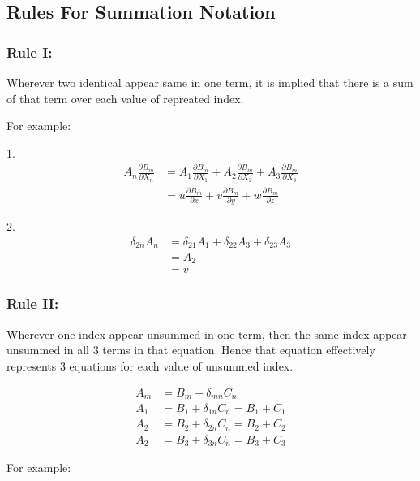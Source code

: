\documentclass[fleqn,10pt]{SelfArx} %
\begin{document}
\subsection{Rules For Summation Notation}
\subsubsection*{Rule I:}
Wherever two identical appear same in one term, it is implied that there is a sum of that term over each value of repreated index.

For example:

1. \vspace{-15pt}
\begin{align*}
	A_n\frac{\partial B_m}{\partial X_n} & = A_1\frac{\partial B_m}{\partial X_1} + A_2\frac{\partial B_m}{\partial X_2} + A_3\frac{\partial B_m}{\partial X_3} \\
	                                     & = u\frac{\partial B_m}{\partial x} + v\frac{\partial B_m}{\partial y} + w\frac{\partial B_m}{\partial z}
\end{align*}

2. \vspace{-20pt}
\begin{align*}
	\delta_{2n}A_n & = \delta_{21}A_1 + \delta_{22}A_3 + \delta_{23}A_3 \\
	               & = A_2                                              \\
	               & = v
\end{align*}

\subsubsection*{Rule II:}
Wherever one index appear unsummed in one term, then the same index appear unsummed in all 3 terms in that equation. Hence that equation effectively represents 3 equations for each value of unsummed index.

\vspace{-10pt}
\begin{align*}
	A_m & = B_m + \delta_{mn}C_n             \\
	A_1 & = B_1 + \delta_{1n}C_n = B_1 + C_1 \\
	A_2 & = B_2 + \delta_{2n}C_n = B_2 + C_2 \\
	A_2 & = B_3 + \delta_{3n}C_n = B_3 + C_3
\end{align*}

For example:
\end{document}
